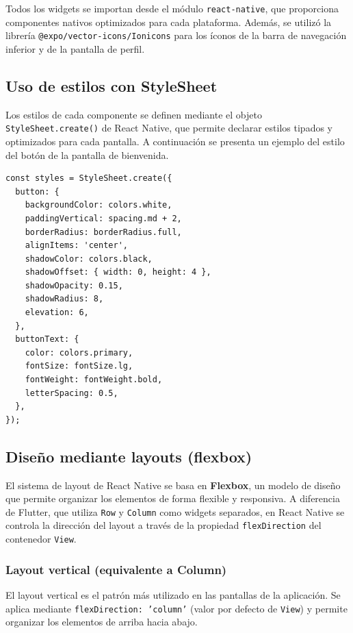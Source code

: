 Todos los widgets se importan desde el m\'odulo \texttt{react-native}, que
proporciona componentes nativos optimizados para cada plataforma. Adem\'as, se
utiliz\'o la librer\'ia \texttt{@expo/vector-icons/Ionicons} para los
\'iconos de la barra de navegaci\'on inferior y de la pantalla de perfil.

\subsection{Uso de estilos con StyleSheet}

Los estilos de cada componente se definen mediante el objeto
\texttt{StyleSheet.create()} de React Native, que permite declarar estilos
tipados y optimizados para cada pantalla. A continuaci\'on se presenta un
ejemplo del estilo del bot\'on de la pantalla de bienvenida.

\begin{lstlisting}
const styles = StyleSheet.create({
  button: {
    backgroundColor: colors.white,
    paddingVertical: spacing.md + 2,
    borderRadius: borderRadius.full,
    alignItems: 'center',
    shadowColor: colors.black,
    shadowOffset: { width: 0, height: 4 },
    shadowOpacity: 0.15,
    shadowRadius: 8,
    elevation: 6,
  },
  buttonText: {
    color: colors.primary,
    fontSize: fontSize.lg,
    fontWeight: fontWeight.bold,
    letterSpacing: 0.5,
  },
});
\end{lstlisting}

\subsection{Dise\~no mediante layouts (flexbox)}

El sistema de layout de React Native se basa en \textbf{Flexbox}, un modelo de
dise\~no que permite organizar los elementos de forma flexible y responsiva. A
diferencia de Flutter, que utiliza \texttt{Row} y \texttt{Column} como
widgets separados, en React Native se controla la direcci\'on del layout a
trav\'es de la propiedad \texttt{flexDirection} del contenedor \texttt{View}.

\subsubsection{Layout vertical (equivalente a Column)}

El layout vertical es el patr\'on m\'as utilizado en las pantallas de la
aplicaci\'on. Se aplica mediante \texttt{flexDirection: 'column'} (valor por
defecto de \texttt{View}) y permite organizar los elementos de arriba hacia
abajo.

